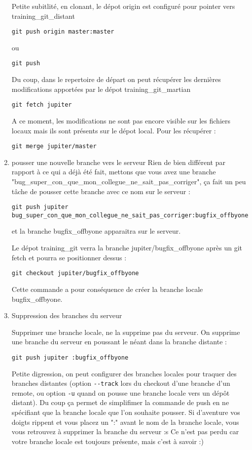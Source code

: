 \documentclass[10pt]{exam}
\begin{document}
\begin{questions}
\begin{enumerate}
Petite subitlité, en clonant, le dépot origin est configuré pour pointer vers training\_git\_distant
\begin{lstlisting}
git push origin master:master
\end{lstlisting}
ou
\begin{lstlisting}
git push
\end{lstlisting}
Du coup, dans le repertoire de départ on peut récupérer les dernières modifications apportées par le dépot training\_git\_martian
\begin{lstlisting}
git fetch jupiter
\end{lstlisting}
A ce moment, les modifications ne sont pas encore visible sur les fichiers locaux mais ils sont présents sur le dépot local. Pour les récupérer :
\begin{lstlisting}
git merge jupiter/master
\end{lstlisting}

\item pousser une nouvelle branche vers le serveur
Rien de bien différent par rapport à ce qui a déjà été fait, mettons que vous avez une branche "bug\_super\_con\_que\_mon\_collegue\_ne\_sait\_pas\_corriger", ça fait un peu tâche de pousser cette branche avec ce nom sur le serveur :
\begin{lstlisting}
git push jupiter bug_super_con_que_mon_collegue_ne_sait_pas_corriger:bugfix_offbyone
\end{lstlisting}
et la branche bugfix\_offbyone apparaitra sur le serveur.

Le dépot training\_git verra la branche jupiter/bugfix\_offbyone après un git fetch et pourra se positionner dessus :
\begin{lstlisting}
git checkout jupiter/bugfix_offbyone
\end{lstlisting}
Cette commande a pour conséquence de créer la branche locale bugfix\_offbyone.

\item Suppression des branches du serveur

Supprimer une branche locale, ne la supprime pas du serveur. On supprime une branche du serveur en poussant le néant dans la branche distante :
\begin{lstlisting}
git push jupiter :bugfix_offbyone
\end{lstlisting}
Petite digression, on peut configurer des branches locales pour traquer des branches distantes (option \texttt{-{}-track} lors du checkout d'une branche d'un remote, ou option \texttt{-u} quand on pousse une branche locale vers un dépôt distant). Du coup ça permet de simplifimer la commande de push en ne spécifiant que la branche locale que l'on souhaite pousser. Si d'aventure vos doigts rippent et vous placez un ":" avant le nom de la branche locale, vous vous retrouvez à supprimer la branche du serveur :s Ce n'est pas perdu car votre branche locale est toujours présente, mais c'est à savoir :)
\end{enumerate}


\end{questions}
\end{document}
